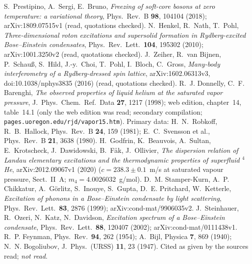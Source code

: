  S.~Prestipino, A.~Sergi, E.~Bruno, \emph{Freezing of soft-core bosons at zero temperature: a
variational theory}, Phys.\ Rev.\ B \textbf{98}, 104104 (2018); arXiv:1809.07515v1 (read, quotations checked).
 N.~Henkel, R.~Nath, T.~Pohl, \emph{Three-dimensional roton excitations and supersolid formation in
Rydberg-excited Bose--Einstein condensates}, Phys.\ Rev.\ Lett.\ \textbf{104}, 195302 (2010); arXiv:1001.3250v2 (read,
quotations checked).
 J.~Zeiher, R.~van Bijnen, P.~Schau\ss, S.~Hild, J.-y.~Choi, T.~Pohl, I.~Bloch, C.~Gross,
\emph{Many-body interferometry of a Rydberg-dressed spin lattice}, arXiv:1602.06313v3, doi:10.1038/nphys3835 (2016)
(read, quotations checked).
 R.~J. Donnelly, C.~F. Barenghi, \emph{The observed properties of liquid helium at the saturated vapor
pressure}, J.\ Phys.\ Chem.\ Ref.\ Data \textbf{27}, 1217 (1998); web edition, chapter~14, table~14.1 (only
the web edition was read; secondary compilation; \texttt{pages.uoregon.edu/rjd/vapor15.htm}). Primary data: H.~N.~Robkoff, R.~B.~Hallock, Phys.\ Rev.\ B \textbf{24}, 159 (1981); E.~C.~Svensson et al., Phys.\ Rev.\ B \textbf{21}, 3638 (1980).
 H.~Godfrin, K.~Beauvois, A.~Sultan, E.~Krotscheck, J.~Dawidowski, B.~F{\aa}k, J.~Ollivier,
\emph{The dispersion relation of Landau elementary excitations and the thermodynamic properties of superfluid $^4$He},
arXiv:2012.09067v1 (2020) ($c=238.3\pm0.1$~m/s at saturated vapour pressure, Sect.~II~A; $m_4=4.0026032$~g/mol).
 D.~M. Stamper-Kurn, A.~P. Chikkatur, A.~G\"orlitz, S.~Inouye, S.~Gupta, D.~E. Pritchard, W.~Ketterle,
\emph{Excitation of phonons in a Bose--Einstein condensate by light scattering}, Phys.\ Rev.\ Lett.\ \textbf{83}, 2876
(1999); arXiv:cond-mat/9906035v2.
 J.~Steinhauer, R.~Ozeri, N.~Katz, N.~Davidson, \emph{Excitation spectrum of a Bose--Einstein
condensate}, Phys.\ Rev.\ Lett.\ \textbf{88}, 120407 (2002); arXiv:cond-mat/0111438v1.
 R.~P. Feynman, Phys.\ Rev.\ \textbf{94}, 262 (1954); A.~Bijl, Physica \textbf{7}, 869 (1940);
N.~N. Bogoliubov, J.\ Phys.\ (URSS) \textbf{11}, 23 (1947). Cited as given by the sources read; \emph{not read}.
